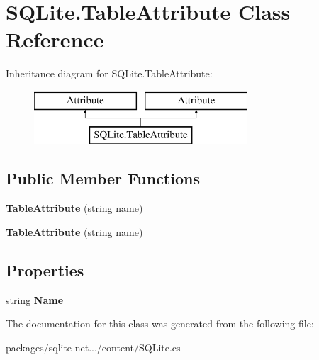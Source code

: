 \hypertarget{classSQLite_1_1TableAttribute}{\section{S\-Q\-Lite.\-Table\-Attribute Class Reference}
\label{classSQLite_1_1TableAttribute}
}
Inheritance diagram for S\-Q\-Lite.\-Table\-Attribute\-:\begin{figure}[H]
\begin{center}
\leavevmode
\includegraphics[height=2.000000cm]{classSQLite_1_1TableAttribute}
\end{center}
\end{figure}
\subsection*{Public Member Functions}
\begin{DoxyCompactItemize}
\item 
\hypertarget{classSQLite_1_1TableAttribute_aa1d302b1fb306a6f5fcbbf5116c9ac55}{{\bfseries Table\-Attribute} (string name)}\label{classSQLite_1_1TableAttribute_aa1d302b1fb306a6f5fcbbf5116c9ac55}

\item 
\hypertarget{classSQLite_1_1TableAttribute_aa1d302b1fb306a6f5fcbbf5116c9ac55}{{\bfseries Table\-Attribute} (string name)}\label{classSQLite_1_1TableAttribute_aa1d302b1fb306a6f5fcbbf5116c9ac55}

\end{DoxyCompactItemize}
\subsection*{Properties}
\begin{DoxyCompactItemize}
\item 
\hypertarget{classSQLite_1_1TableAttribute_aa1c9a6d74e6f322fa9e3c3229a600dde}{string {\bfseries Name}}\label{classSQLite_1_1TableAttribute_aa1c9a6d74e6f322fa9e3c3229a600dde}

\end{DoxyCompactItemize}


The documentation for this class was generated from the following file\-:\begin{DoxyCompactItemize}
\item 
packages/sqlite-\/net.../content/S\-Q\-Lite.\-cs\end{DoxyCompactItemize}
